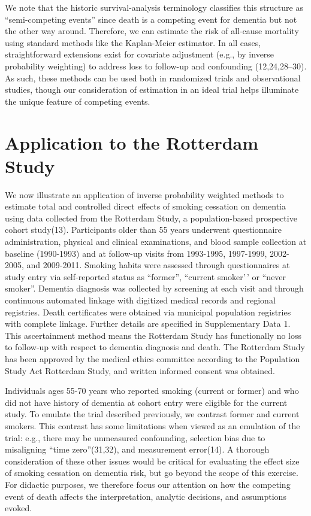 \documentclass[
]{book}
\begin{document}
We note that the historic survival-analysis terminology classifies this structure as ``semi-competing events'' since death is a competing event for dementia but not the other way around. Therefore, we can estimate the risk of all-cause mortality using standard methods like the Kaplan-Meier estimator. In all cases, straightforward extensions exist for covariate adjustment (e.g., by inverse probability weighting) to address loss to follow-up and confounding (12,24,28--30). As such, these methods can be used both in randomized trials and observational studies, though our consideration of estimation in an ideal trial helps illuminate the unique feature of competing events.

\hypertarget{application-to-the-rotterdam-study}{%
\section{Application to the Rotterdam Study}\label{application-to-the-rotterdam-study}}

We now illustrate an application of inverse probability weighted methods to estimate total and controlled direct effects of smoking cessation on dementia using data collected from the Rotterdam Study, a population-based prospective cohort study(13). Participants older than 55 years underwent questionnaire administration, physical and clinical examinations, and blood sample collection at baseline (1990-1993) and at follow-up visits from 1993-1995, 1997-1999, 2002-2005, and 2009-2011. Smoking habits were assessed through questionnaires at study entry via self-reported status as ``former'', ``current smoker'\,' or ``never smoker''. Dementia diagnosis was collected by screening at each visit and through continuous automated linkage with digitized medical records and regional registries. Death certificates were obtained via municipal population registries with complete linkage. Further details are specified in Supplementary Data 1. This ascertainment method means the Rotterdam Study has functionally no loss to follow-up with respect to dementia diagnosis and death. The Rotterdam Study has been approved by the medical ethics committee according to the Population Study Act Rotterdam Study, and written informed consent was obtained.

Individuals ages 55-70 years who reported smoking (current or former) and who did not have history of dementia at cohort entry were eligible for the current study. To emulate the trial described previously, we contrast former and current smokers. This contrast has some limitations when viewed as an emulation of the trial: e.g., there may be unmeasured confounding, selection bias due to misaligning ``time zero''(31,32), and measurement error(14). A thorough consideration of these other issues would be critical for evaluating the effect size of smoking cessation on dementia risk, but go beyond the scope of this exercise. For didactic purposes, we therefore focus our attention on how the competing event of death affects the interpretation, analytic decisions, and assumptions evoked.
\end{document}
